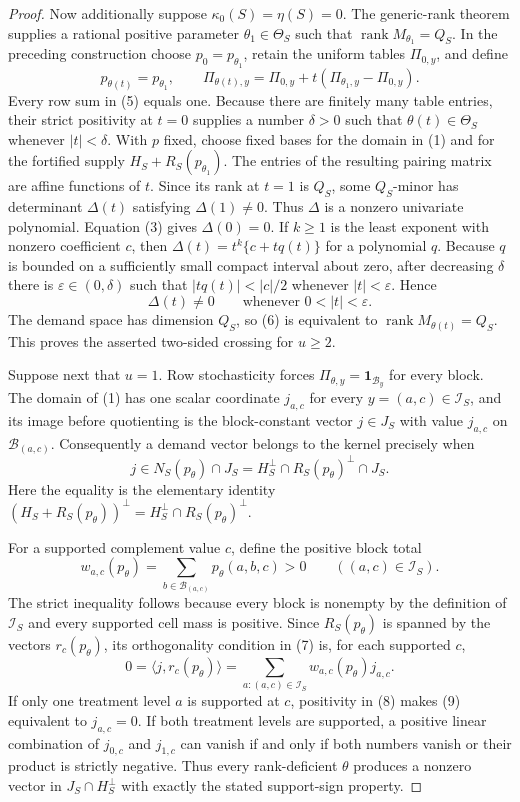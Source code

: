 \documentclass{article}
\begin{document}
\begin{proof}
Now additionally suppose \(\kappa_0(S)=\eta(S)=0\).  The generic-rank theorem supplies a rational positive parameter \(\theta_1\in\Theta_S\) such that \(\operatorname{rank}M_{\theta_1}=Q_S\).  In the preceding construction choose \(p_0=p_{\theta_1}\), retain the uniform tables \(\Pi_{0,y}\), and define
\[
p_{\theta(t)}=p_{\theta_1},
\qquad
\Pi_{\theta(t),y}=\Pi_{0,y}+t(\Pi_{\theta_1,y}-\Pi_{0,y}).
\tag{5}
\]
Every row sum in (5) equals one.  Because there are finitely many table entries, their strict positivity at \(t=0\) supplies a number \(\delta>0\) such that \(\theta(t)\in\Theta_S\) whenever \(|t|<\delta\).  With \(p\) fixed, choose fixed bases for the domain in (1) and for the fortified supply \(H_S+R_S(p_{\theta_1})\).  The entries of the resulting pairing matrix are affine functions of \(t\).  Since its rank at \(t=1\) is \(Q_S\), some \(Q_S\)-minor has determinant \(\Delta(t)\) satisfying \(\Delta(1)\neq0\).  Thus \(\Delta\) is a nonzero univariate polynomial.  Equation (3) gives \(\Delta(0)=0\).  If \(k\geq1\) is the least exponent with nonzero coefficient \(c\), then \(\Delta(t)=t^k\{c+tq(t)\}\) for a polynomial \(q\).  Because \(q\) is bounded on a sufficiently small compact interval about zero, after decreasing \(\delta\) there is \(\varepsilon\in(0,\delta)\) such that \(|tq(t)|<|c|/2\) whenever \(|t|<\varepsilon\).  Hence
\[
\Delta(t)\neq0\qquad\text{whenever }0<|t|<\varepsilon.
\tag{6}
\]
The demand space has dimension \(Q_S\), so (6) is equivalent to \(\operatorname{rank}M_{\theta(t)}=Q_S\).  This proves the asserted two-sided crossing for \(u\geq2\).

Suppose next that \(u=1\).  Row stochasticity forces \(\Pi_{\theta,y}=\mathbf1_{\mathcal B_y}\) for every block.  The domain of (1) has one scalar coordinate \(j_{a,c}\) for every \(y=(a,c)\in\mathcal I_S\), and its image before quotienting is the block-constant vector \(j\in J_S\) with value \(j_{a,c}\) on \(\mathcal B_{(a,c)}\).  Consequently a demand vector belongs to the kernel precisely when
\[
j\in N_S(p_\theta)\cap J_S
=H_S^\perp\cap R_S(p_\theta)^\perp\cap J_S.
\tag{7}
\]
Here the equality is the elementary identity \((H_S+R_S(p_\theta))^\perp=H_S^\perp\cap R_S(p_\theta)^\perp\).

For a supported complement value \(c\), define the positive block total
\[
w_{a,c}(p_\theta)
=\sum_{b\in\mathcal B_{(a,c)}}p_\theta(a,b,c)>0
\qquad ((a,c)\in\mathcal I_S).
\tag{8}
\]
The strict inequality follows because every block is nonempty by the definition of \(\mathcal I_S\) and every supported cell mass is positive.  Since \(R_S(p_\theta)\) is spanned by the vectors \(r_c(p_\theta)\), its orthogonality condition in (7) is, for each supported \(c\),
\[
0=\langle j,r_c(p_\theta)\rangle
=\sum_{a:(a,c)\in\mathcal I_S}w_{a,c}(p_\theta)j_{a,c}.
\tag{9}
\]
If only one treatment level \(a\) is supported at \(c\), positivity in (8) makes (9) equivalent to \(j_{a,c}=0\).  If both treatment levels are supported, a positive linear combination of \(j_{0,c}\) and \(j_{1,c}\) can vanish if and only if both numbers vanish or their product is strictly negative.  Thus every rank-deficient \(\theta\) produces a nonzero vector in \(J_S\cap H_S^\perp\) with exactly the stated support-sign property.


\end{proof}
\end{document}
